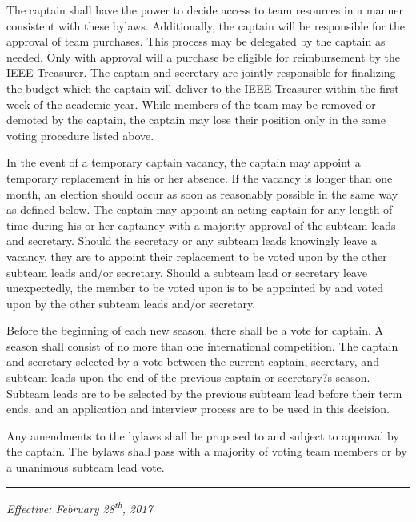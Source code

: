 \documentclass[12pt]{constitution}
\begin{document}
The captain shall have the power to decide access to team resources in a manner consistent with these bylaws. Additionally, the captain will be responsible for the approval of team purchases. This process may be delegated by the captain as needed. Only with approval will a purchase be eligible for reimbursement by the IEEE Treasurer. The captain and secretary are jointly responsible for finalizing the budget which the captain will deliver to the IEEE Treasurer within the first week of the academic year. While members of the team may be removed or demoted by the captain, the captain may lose their position only in the same voting procedure listed above.

In the event of a temporary captain vacancy, the captain may appoint a temporary replacement in his or her absence. If the vacancy is longer than one month, an election should occur as soon as reasonably possible in the same way as defined below. The captain may appoint an acting captain for any length of time during his or her captaincy with a majority approval of the subteam leads and secretary. Should the secretary or any subteam leads knowingly leave a vacancy, they are to appoint their replacement to be voted upon by the other subteam leads and/or secretary. Should a subteam lead or secretary leave unexpectedly, the member to be voted upon is to be appointed by and voted upon by the other subteam leads and/or secretary.

\label{art:elect}

Before the beginning of each new season, there shall be a vote for captain. A season shall consist of no more than one international competition. The captain and secretary selected by a vote between the current captain, secretary, and subteam leads upon the end of the previous captain or secretary?s season. Subteam leads are to be selected by the previous subteam lead before their term ends, and an application and interview process are to be used in this decision.


\label{art:bylaw}

Any amendments to the bylaws shall be proposed to and subject to approval by the captain. The bylaws shall pass with a majority of voting team members or by a unanimous subteam lead vote.


\vspace{12pt}
\hrule

\textit{Effective: February 28\textsuperscript{th}, 2017}


\setcounter{tocdepth}{1}
\listoftodos %
\end{document}
